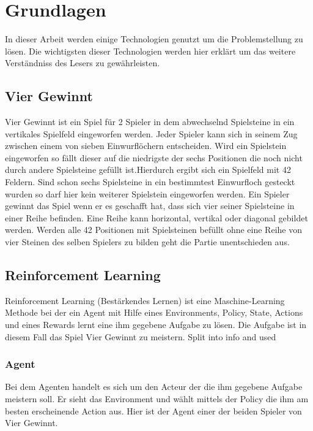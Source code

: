 \chapter{Grundlagen}%

\label{cha:Schluss}

In dieser Arbeit werden einige Technologien genutzt um die Problemstellung zu lösen.
Die wichtigsten dieser Technologien werden hier erklärt um das weitere Verständniss des Lesers zu gewährleisten. 


\section{Vier Gewinnt}
Vier Gewinnt ist ein Spiel für 2 Spieler in dem abwechselnd Spielsteine in ein vertikales Spielfeld eingeworfen werden. Jeder Spieler kann sich in seinem Zug zwischen einem von sieben Einwurflöchern entscheiden. Wird ein Spielstein eingeworfen so fällt dieser auf die niedrigste der sechs Positionen die noch nicht durch andere Spielsteine gefüllt ist.Hierdurch ergibt sich ein Spielfeld mit 42 Feldern.  Sind schon sechs Spielsteine in ein bestimmtest Einwurfloch gesteckt wurden so darf hier kein weiterer Spielstein eingeworfen werden. Ein Spieler gewinnt das Spiel wenn er es geschafft  hat, dass sich vier seiner Spielsteine in einer Reihe befinden. Eine Reihe kann horizontal, vertikal oder diagonal gebildet werden. Werden alle 42 Positionen mit Spielsteinen befüllt ohne eine Reihe von vier Steinen des selben Spielers zu bilden geht die Partie unentschieden aus.


\section{Reinforcement Learning}
Reinforcement Learning (Bestärkendes Lernen) ist eine Maschine-Learning Methode bei der ein Agent mit Hilfe eines Environments, Policy, State, Actions und eines Rewards lernt eine ihm gegebene Aufgabe zu lösen.
Die Aufgabe ist in diesem Fall das Spiel Vier Gewinnt zu meistern.
\colorbox{red!30}{Split into info and used} %

\subsection{Agent}
Bei dem Agenten handelt es sich um den Acteur der die ihm gegebene Aufgabe meistern soll. Er sieht das Environment und wählt mittels der Policy die ihm am besten erscheinende Action aus.
Hier ist der Agent einer der beiden Spieler von Vier Gewinnt.

